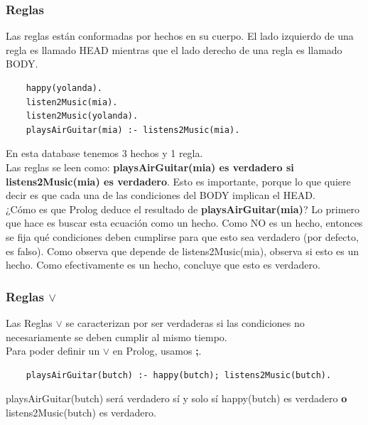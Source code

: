 \documentclass[10pt,a4paper]{article}
\begin{document}
\subsubsection*{Reglas}
Las reglas están conformadas por hechos en su cuerpo. El lado izquierdo de una regla es llamado HEAD mientras que el lado derecho de una regla es llamado BODY. \\
\begin{lstlisting}
    happy(yolanda).
    listen2Music(mia).
    listen2Music(yolanda).
    playsAirGuitar(mia) :- listens2Music(mia).
\end{lstlisting}
En esta database tenemos 3 hechos y 1 regla. \\
Las reglas se leen como: \textbf{playsAirGuitar(mia) es verdadero si listens2Music(mia) es verdadero}. Esto es importante, porque lo que quiere decir es que cada una de las condiciones del BODY implican el HEAD. \\
¿Cómo es que Prolog deduce el resultado de \textbf{playsAirGuitar(mia)}? Lo primero que hace es buscar esta ecuación como un hecho. Como NO es un hecho, entonces se fija qué condiciones deben cumplirse para que esto sea verdadero (por defecto, es falso). Como observa que depende de listens2Music(mia), observa si esto es un hecho. Como efectivamente es un hecho, concluye que esto es verdadero. 
\subsubsection*{Reglas $\lor$}
Las Reglas $\lor$ se caracterizan por ser verdaderas si las condiciones no necesariamente se deben cumplir al mismo tiempo. \\
Para poder definir un $\lor$ en Prolog, usamos \textbf{;}.
\begin{lstlisting}
    playsAirGuitar(butch) :- happy(butch); listens2Music(butch).
\end{lstlisting}
playsAirGuitar(butch) será verdadero sí y solo sí happy(butch) es verdadero \textbf{o} listens2Music(butch) es verdadero.
\end{document}
